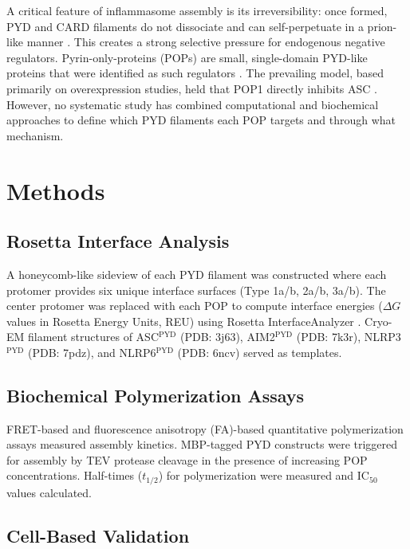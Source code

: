 \documentclass[11pt]{article}
\begin{document}
A critical feature of inflammasome assembly is its irreversibility: once formed, PYD and CARD filaments do not dissociate and can self-perpetuate in a prion-like manner \citep{morrone2015assembly}. This creates a strong selective pressure for endogenous negative regulators. Pyrin-only-proteins (POPs) are small, single-domain PYD-like proteins that were identified as such regulators \citep{dejesus2007copsandpops}. The prevailing model, based primarily on overexpression studies, held that POP1 directly inhibits ASC \citep{khare2012pop1}. However, no systematic study has combined computational and biochemical approaches to define which PYD filaments each POP targets and through what mechanism.

\section{Methods}

\subsection{Rosetta Interface Analysis}

A honeycomb-like sideview of each PYD filament was constructed where each protomer provides six unique interface surfaces (Type 1a/b, 2a/b, 3a/b). The center protomer was replaced with each POP to compute interface energies ($\Delta G$ values in Rosetta Energy Units, REU) using Rosetta InterfaceAnalyzer \citep{rosettainterfaceanalyzer2015}. Cryo-EM filament structures of ASC$^{\text{PYD}}$ (PDB: 3j63), AIM2$^{\text{PYD}}$ (PDB: 7k3r), NLRP3$^{\text{PYD}}$ (PDB: 7pdz), and NLRP6$^{\text{PYD}}$ (PDB: 6ncv) served as templates.

\subsection{Biochemical Polymerization Assays}

FRET-based and fluorescence anisotropy (FA)-based quantitative polymerization assays measured assembly kinetics. MBP-tagged PYD constructs were triggered for assembly by TEV protease cleavage in the presence of increasing POP concentrations. Half-times ($t_{1/2}$) for polymerization were measured and IC$_{50}$ values calculated.

\subsection{Cell-Based Validation}
\end{document}

